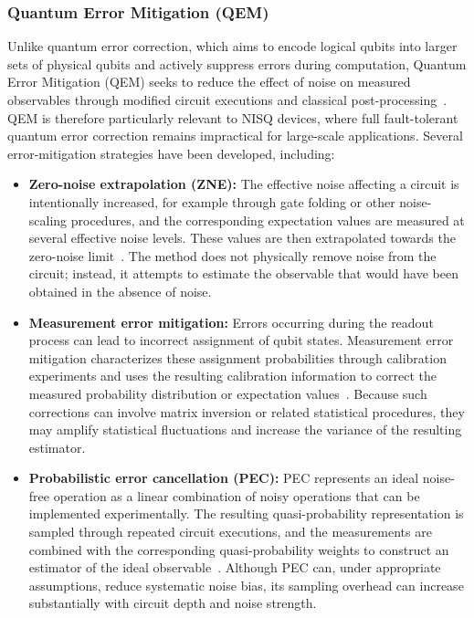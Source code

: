 \subsubsection{Quantum Error Mitigation (QEM)}
Unlike quantum error correction, which aims to encode logical qubits into larger sets of physical qubits and actively suppress errors during computation, Quantum Error Mitigation (QEM) seeks to reduce the effect of noise on measured observables through modified circuit executions and classical post-processing~\cite{error_mitigation_2}. QEM is therefore particularly relevant to NISQ devices, where full fault-tolerant quantum error correction remains impractical for large-scale applications.
Several error-mitigation strategies have been developed, including:
\begin{itemize}
\item \textbf{Zero-noise extrapolation (ZNE):} The effective noise affecting a circuit is intentionally increased, for example through gate folding or other noise-scaling procedures, and the corresponding expectation values are measured at several effective noise levels. These values are then extrapolated towards the zero-noise limit~\cite{error_mitigation_3}. The method does not physically remove noise from the circuit; instead, it attempts to estimate the observable that would have been obtained in the absence of noise.
\item \textbf{Measurement error mitigation:} Errors occurring during the readout process can lead to incorrect assignment of qubit states. Measurement error mitigation characterizes these assignment probabilities through calibration experiments and uses the resulting calibration information to correct the measured probability distribution or expectation values~\cite{error_mitigation_4}. Because such corrections can involve matrix inversion or related statistical procedures, they may amplify statistical fluctuations and increase the variance of the resulting estimator.
\item \textbf{Probabilistic error cancellation (PEC):} PEC represents an ideal noise-free operation as a linear combination of noisy operations that can be implemented experimentally. The resulting quasi-probability representation is sampled through repeated circuit executions, and the measurements are combined with the corresponding quasi-probability weights to construct an estimator of the ideal observable~\cite{error_mitigation_3}. Although PEC can, under appropriate assumptions, reduce systematic noise bias, its sampling overhead can increase substantially with circuit depth and noise strength.
\end{itemize}
